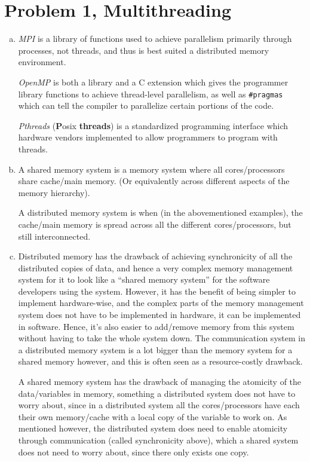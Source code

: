 \documentclass[fontsize=11pt, paper=a4, titlepage]{article}
\begin{document}
\section{Problem 1, Multithreading}
\begin{enumerate}[a)]

    \item \textit{MPI} is a library of functions used to achieve parallelism
primarily through processes, not threads, and thus is best suited a distributed
memory environment.

\textit{OpenMP} is both a library and a C extension which gives the programmer
library functions to achieve thread-level parallelism, as well as
\lstinline!#pragmas! which can tell the compiler to parallelize certain portions
of the code.

\textit{Pthreads} (\textbf{P}osix \textbf{threads}) is a standardized
programming interface which hardware vendors implemented to allow programmers to
program with threads.

    \item A shared memory system is a memory system where all cores/processors
share cache/main memory. (Or equivalently across different aspects of the memory
hierarchy).

A distributed memory system is when (in the abovementioned examples), the
cache/main memory is spread across all the different cores/processors, but still
interconnected.

    \item Distributed memory has the drawback of achieving synchronicity of all
the distributed copies of data, and hence a very complex memory management
system for it to look like a ``shared memory system'' for the software
developers using the system. However, it has the benefit of being simpler to
implement hardware-wise, and the complex parts of the memory management system
does not have to be implemented in hardware, it can be implemented in software.
Hence, it's also easier to add/remove memory from this system without having to
take the whole system down. The communication system in a distributed memory
system is a lot bigger than the memory system for a shared memory however, and
this is often seen as a resource-costly drawback.

A shared memory system has the drawback of managing the atomicity of the
data/variables in memory, something a distributed system does not have to worry
about, since in a distributed system all the cores/processors have each their
own memory/cache with a local copy of the variable to work on. As mentioned
however, the distributed system does need to enable atomicity through
communication (called synchronicity above), which a shared system does not need
to worry about, since there only exists one copy.


\end{enumerate}
\end{document}
